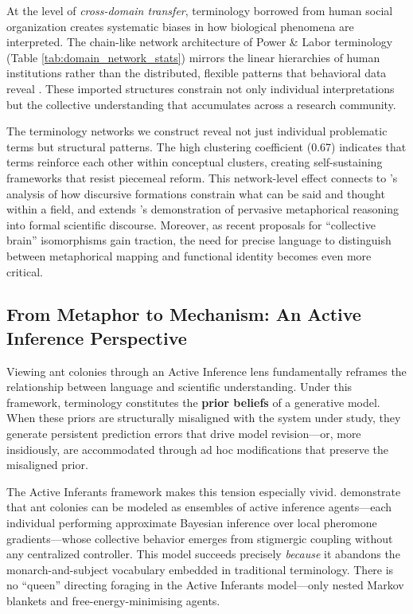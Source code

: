 \documentclass[
]{article}
\numberwithin{equation}{section}
\begin{document}
At the level of \emph{cross-domain transfer}, terminology borrowed from
human social organization creates systematic biases in how biological
phenomena are interpreted. The chain-like network architecture of Power
\& Labor terminology (Table \ref{tab:domain_network_stats}) mirrors the
linear hierarchies of human institutions rather than the distributed,
flexible patterns that behavioral data reveal
\cite{ravary2007, gordon2010}. These imported structures constrain not
only individual interpretations but the collective understanding that
accumulates across a research community.

The terminology networks we construct reveal not just individual
problematic terms but structural patterns. The high clustering
coefficient (0.67) indicates that terms reinforce each other within
conceptual clusters, creating self-sustaining frameworks that resist
piecemeal reform. This network-level effect connects to
\citeauthor{foucault1972archaeology}'s
\citeyearpar{foucault1972archaeology} analysis of how discursive
formations constrain what can be said and thought within a field, and
extends \citeauthor{lakoff1980metaphors}'s
\citeyearpar{lakoff1980metaphors} demonstration of pervasive
metaphorical reasoning into formal scientific discourse. Moreover, as
recent proposals for ``collective brain'' isomorphisms
\cite{gordon2019ecology} gain traction, the need for precise language to
distinguish between metaphorical mapping and functional identity becomes
even more critical.

\subsection{From Metaphor to Mechanism: An Active Inference
Perspective}\label{from-metaphor-to-mechanism-an-active-inference-perspective}

Viewing ant colonies through an Active Inference lens
\cite{friston2010free, clark2013whatever} fundamentally reframes the
relationship between language and scientific understanding. Under this
framework, terminology constitutes the \textbf{prior beliefs} of a
generative model. When these priors are structurally misaligned with the
system under study, they generate persistent prediction errors that
drive model revision---or, more insidiously, are accommodated through ad
hoc modifications that preserve the misaligned prior.

The Active Inferants framework \citep{friedman2021active} makes this
tension especially vivid. \citet{friedman2021active} demonstrate that
ant colonies can be modeled as ensembles of active inference
agents---each individual performing approximate Bayesian inference over
local pheromone gradients---whose collective behavior emerges from
stigmergic coupling without any centralized controller. This model
succeeds precisely \emph{because} it abandons the monarch-and-subject
vocabulary embedded in traditional terminology. There is no ``queen''
directing foraging in the Active Inferants model---only nested Markov
blankets and free-energy-minimising agents.
\end{document}
